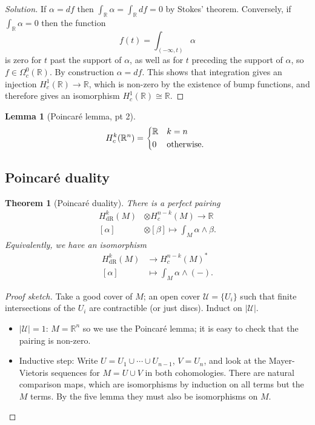 \documentclass[a4paper]{article}
\newtheorem*{theorem}{Theorem}
\newtheorem*{lemma}{Lemma}
\theoremstyle{definition}
\theoremstyle{remark}
\newcommand{\dR}{\text{dR}}
\newcommand{\U}{\mathcal{U}}
\newcommand{\R}{\mathbb{R}}
\begin{document}
\begin{proof}[Solution]
    If $\alpha=df$ then $\int_\R\alpha=\int_\R df=0$ by Stokes' theorem.
    Conversely, if $\int_\R\alpha=0$ then the function
    \begin{equation*}
        f(t)=\int_{(-\infty,t)}\alpha
    \end{equation*}
    is zero for $t$ past the support of $\alpha$, as well as for $t$ preceding
    the support of $\alpha$, so $f\in\Omega^0_c(\R)$. By construction
    $\alpha=df$. This shows that integration gives an injection
    $H^1_c(\R)\to\R$, which is non-zero by the existence of bump functions, and
    therefore gives an isomorphism $H^1_c(\R)\cong\R$.
\end{proof}

\begin{lemma}[Poincar\'e lemma, pt 2]
    \begin{equation*}
        H^k_c(\R^n) = \begin{dcases*}
            \R & $k=n$ \\
            0 & otherwise.
        \end{dcases*}
    \end{equation*}
\end{lemma}

\subsection*{Poincar\'e duality}

\begin{theorem}[Poincar\'e duality]
    There is a perfect pairing
    \begin{align*}
        H^k_\dR(M)&\otimes H^{n-k}_c(M) \to \R \\
        [\alpha]&\otimes[\beta] \mapsto \int_M\alpha\wedge\beta.
    \end{align*}
    Equivalently, we have an isomorphism
    \begin{align*}
        H^k_\dR(M) &\to H^{n-k}_c(M)^* \\
        [\alpha] &\mapsto \int_M\alpha\wedge(-).
    \end{align*}
\end{theorem}

\begin{proof}[Proof sketch]
    Take a good cover of $M$; an open cover $\U=\{U_i\}$ such that
    finite intersections of the $U_i$ are contractible (or just discs). Induct
    on $|\U|$.
    \begin{itemize}
        \item $|\U|=1$: $M=\R^n$ so we use the Poincar\'e lemma; it is easy to
            check that the pairing is non-zero.

        \item Inductive step: Write $U=U_1\cup\cdots\cup U_{n-1}$, $V=U_n$, and
            look at the Mayer-Vietoris sequences for $M=U\cup V$ in both
            cohomologies. There are natural comparison maps, which are
            isomorphisms by induction on all terms but the $M$ terms. By the
            five lemma they must also be isomorphisms on $M$.
    \end{itemize}
\end{proof}
\end{document}

